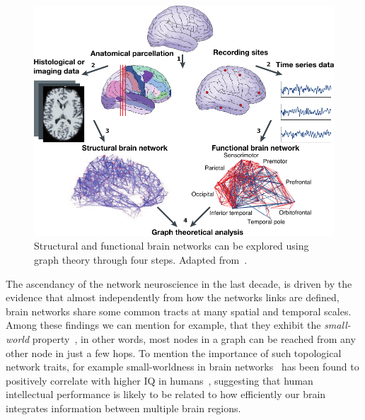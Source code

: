 \begin{figure}[htb!]
\centering
\includegraphics[width=1.0\textwidth]{images/bullmore_2009_pipeline.pdf}
\caption{Structural and functional brain networks can be explored using graph theory through four steps. Adapted from~\cite{bullmore2009}.}
\label{fig:bullmore2009pipeline}
\end{figure}


The ascendancy of the network neuroscience in the last decade, is driven by the evidence that almost independently from how the networks links are defined, brain networks share some common tracts at many spatial and temporal scales. 
Among these findings we can mention for example, that they exhibit the \emph{small-world} property~\cite{watts1998,sporns2002,sporns2004a}, in other words, most nodes in a graph can be reached from any other node in just a few hops. To mention the importance of such topological network traits, for example small-worldness in brain networks~\cite{vandenheuvel2008} has been found to positively correlate with higher IQ in humans~\cite{vandenheuvel2009}, suggesting that human intellectual performance is likely to be related to how efficiently our brain integrates information between multiple brain regions.

